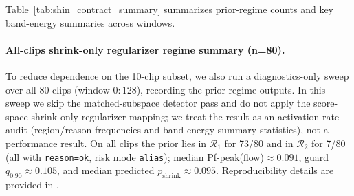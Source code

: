 Table~\ref{tab:shin_contract_summary} summarizes prior-regime counts and key band-energy summaries across windows.

\paragraph{All-clips shrink-only regularizer regime summary (n=80).}
To reduce dependence on the 10-clip subset, we also run a diagnostics-only sweep over all 80 clips (window $0{:}128$), recording the prior regime outputs. In this sweep we skip the matched-subspace detector pass and do not apply the score-space shrink-only regularizer mapping; we treat the result as an activation-rate audit (region/reason frequencies and band-energy summary statistics), not a performance result. On all clips the prior lies in $\mathcal{R}_1$ for 73/80 and in $\mathcal{R}_2$ for 7/80 (all with \texttt{reason=ok}, risk mode \texttt{alias}); median Pf-peak(flow)$\approx 0.091$, guard $q_{0.90}\approx 0.105$, and median predicted $p_{\mathrm{shrink}}\approx 0.095$. Reproducibility details are provided in .

\begin{table}[t]
\centering
\small
{}
\caption{Shin RatBrain Fig3 prior-regime summary band-energy statistics for the frozen Shin-U profile ($e\approx 0.97$, $L_t=64$) across three overlapping windows (10 clips each).}
\label{tab:shin_contract_summary}
\end{table}

